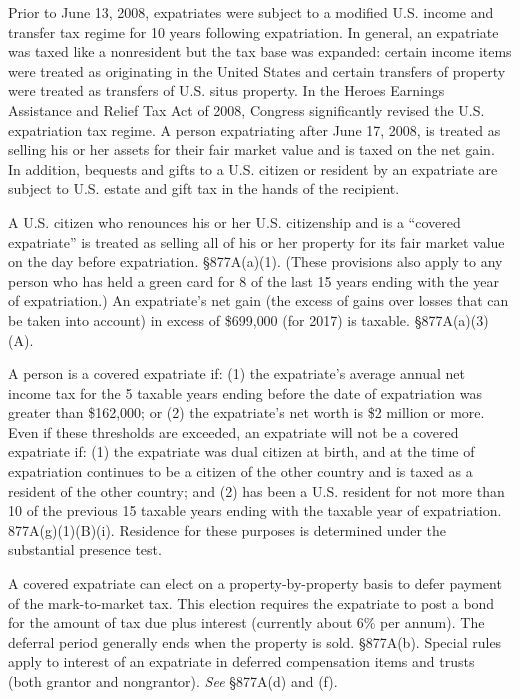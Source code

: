  Prior to June 13, 2008, expatriates were subject to a modified U.S. income and transfer tax regime for 10 years following expatriation.  In general, an expatriate was taxed like a nonresident but the tax base was expanded:  certain income items were treated as originating in the United States and certain transfers of property were treated as transfers of U.S. situs property. In the Heroes Earnings Assistance and Relief Tax Act of 2008, Congress significantly revised the U.S. expatriation tax regime.  A person expatriating after June 17, 2008, is treated as selling his or her assets for their fair market value and is taxed on the net gain. In addition, bequests and gifts to a U.S. citizen or resident by an expatriate are subject to U.S. estate and gift tax in the hands of the recipient. 
 
 A U.S. citizen who renounces his or her U.S. citizenship and is a ``covered expatriate'' is treated as selling all of his or her property for its fair market value on the day before expatriation. \S877A(a)(1).  (These provisions also apply to any person who has held a green card for 8 of the last 15 years ending with the year of expatriation.)   An expatriate's net gain (the excess of gains over losses that can be taken into account) in excess of \$699,000 (for 2017) is taxable.  \S877A(a)(3)(A).  
 
 A person is a covered expatriate if: (1) the expatriate's average annual net income tax for the 5 taxable years ending before the date of expatriation was greater than \$162,000; or (2) the expatriate's net worth is \$2 million or more.   Even if these thresholds are exceeded, an expatriate will not be a covered expatriate if: (1) the expatriate was dual citizen at birth, and at the time of expatriation continues to be a citizen of the other country and is taxed as a resident of the other country; and (2) has been a U.S. resident for not more than 10 of the previous 15 taxable years ending with the taxable year of expatriation.  877A(g)(1)(B)(i).  Residence for these purposes is determined under the substantial presence test.
 
 A covered expatriate can elect on a property-by-property basis to defer payment of the mark-to-market tax.   This election requires the expatriate to post a bond for the amount of tax due plus interest (currently about 6\% per annum).  The deferral period generally ends when the property is sold. \S877A(b).  Special rules apply to interest of an expatriate in deferred compensation items and trusts (both grantor and nongrantor).  \emph{See} \S877A(d) and (f).
 
